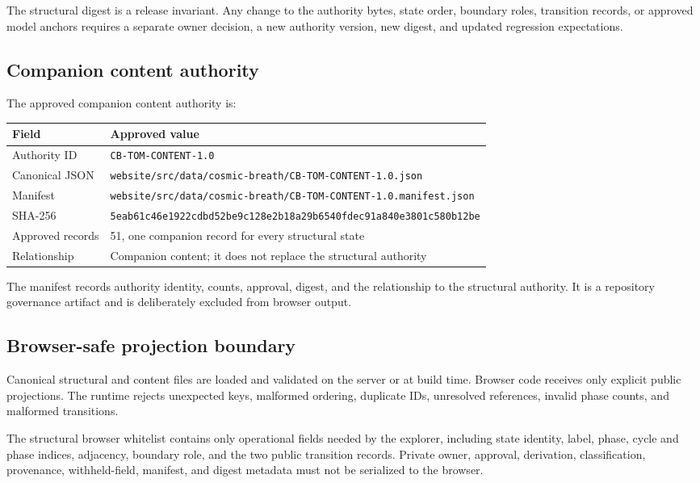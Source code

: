 \documentclass[11pt,letterpaper]{article}
\newcommand{\filepath}[1]{\nolinkurl{#1}}
\newcommand{\release}[1]{\texttt{#1}}
\begin{document}
\begin{safetybox}
The structural digest is a release invariant. Any change to the authority bytes,
state order, boundary roles, transition records, or approved model anchors
requires a separate owner decision, a new authority version, new digest, and
updated regression expectations.
\end{safetybox}

\subsection{Companion content authority}

The approved companion content authority is:

\begin{tabularx}{\textwidth}{L{2.05in}Y}
\toprule
\textbf{Field} & \textbf{Approved value} \\
\midrule
Authority ID & \release{CB-TOM-CONTENT-1.0} \\
Canonical JSON & \filepath{website/src/data/cosmic-breath/CB-TOM-CONTENT-1.0.json} \\
Manifest & \filepath{website/src/data/cosmic-breath/CB-TOM-CONTENT-1.0.manifest.json} \\
SHA-256 & \filepath{5eab61c46e1922cdbd52be9c128e2b18a29b6540fdec91a840e3801c580b12be} \\
Approved records & 51, one companion record for every structural state \\
Relationship & Companion content; it does not replace the structural authority \\
\bottomrule
\end{tabularx}

The manifest records authority identity, counts, approval, digest, and the
relationship to the structural authority. It is a repository governance
artifact and is deliberately excluded from browser output.

\subsection{Browser-safe projection boundary}

Canonical structural and content files are loaded and validated on the server or
at build time. Browser code receives only explicit public projections. The
runtime rejects unexpected keys, malformed ordering, duplicate IDs, unresolved
references, invalid phase counts, and malformed transitions.

The structural browser whitelist contains only operational fields needed by the
explorer, including state identity, label, phase, cycle and phase indices,
adjacency, boundary role, and the two public transition records. Private owner,
approval, derivation, classification, provenance, withheld-field, manifest, and
digest metadata must not be serialized to the browser.
\end{document}
